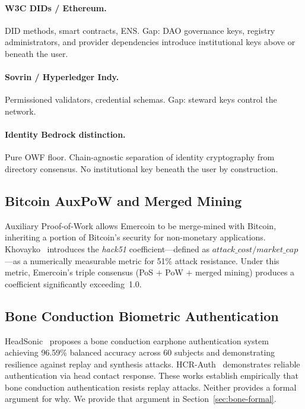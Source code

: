 \documentclass[12pt,a4paper]{article}
\begin{document}
\paragraph{W3C DIDs / Ethereum.} DID methods, smart contracts, ENS. Gap:
DAO governance keys, registry administrators, and provider dependencies
introduce institutional keys above or beneath the user.

\paragraph{Sovrin / Hyperledger Indy.} Permissioned validators, credential
schemas. Gap: steward keys control the network.

\paragraph{Identity Bedrock distinction.} Pure OWF floor. Chain-agnostic
separation of identity cryptography from directory consensus. No
institutional key beneath the user by construction.

\subsection{Bitcoin AuxPoW and Merged Mining}

Auxiliary Proof-of-Work allows Emercoin to be merge-mined with Bitcoin,
inheriting a portion of Bitcoin's security for non-monetary applications.
Khovayko~\cite{hack51} introduces the \emph{hack51} coefficient---defined
as $\mathit{attack\_cost}/\mathit{market\_cap}$---as a numerically
measurable metric for 51\% attack resistance. Under this metric,
Emercoin's triple consensus (PoS $+$ PoW $+$ merged mining) produces a
coefficient significantly exceeding~1.0.

\subsection{Bone Conduction Biometric Authentication}

HeadSonic~\cite{HeadSonic25} proposes a bone conduction earphone
authentication system achieving 96.59\% balanced accuracy across 60
subjects and demonstrating resilience against replay and synthesis
attacks. HCR-Auth~\cite{HCRAuth24} demonstrates reliable authentication
via head contact response. These works establish empirically that bone
conduction authentication resists replay attacks. Neither provides a
formal argument for why. We provide that argument in
Section~\ref{sec:bone-formal}.
\end{document}
